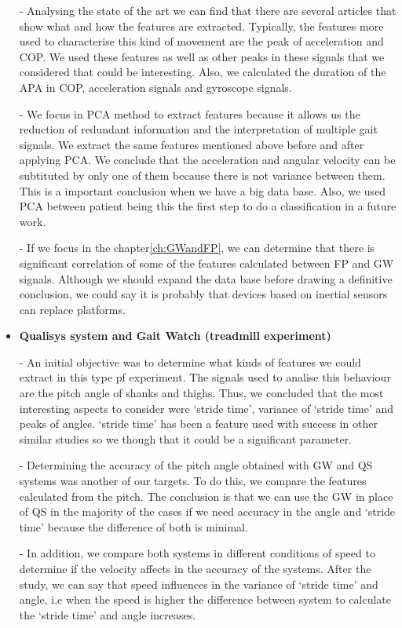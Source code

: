 \begin{itemize}
-	Analysing the state of the art we can find that there are several articles that show what and how the features are extracted. Typically, the features more used to characterise this kind of movement are the peak of acceleration and COP. We used these features  as well as other peaks in these signals that we considered that could be interesting. Also, we calculated the duration of the APA in COP, acceleration signals and gyroscope signals.

-	We focus in PCA method to extract features because it allows us the reduction of redundant information and the interpretation of multiple gait signals. We extract the same features mentioned above before and after applying PCA. We conclude that the acceleration and angular velocity can be subtituted by only one of them because there is not variance between them. This is a important conclusion when we have  a big data base. 
Also, we used PCA between patient  being this the first step to do a classification in a future work.

-	If we focus in the chapter\ref{ch:GWandFP}, we can determine that there is significant correlation  of some of the features calculated between FP and GW signals. Although  we should expand the data base before drawing a definitive conclusion, we could say  it is probably that devices based on inertial sensors can replace platforms.



\item \textbf{Qualisys system and Gait Watch (treadmill experiment)}

-	An initial objective was to determine what kinds of features we could extract in this type pf experiment. The signals used to analise this behaviour are the pitch angle of shanks and thighs. Thus, we concluded that the most interesting aspects to consider were ‘stride time’, variance of ‘stride time’  and peaks of angles. ‘stride time’ has been a feature used with success in other similar studies so we though that it could be a significant parameter.

-	Determining the accuracy of the pitch angle obtained with GW and QS systems was another of our targets. To do this, we compare the features calculated from the pitch. The conclusion is that we can use the GW in place of QS in the majority of the cases if we need accuracy in the angle and ‘stride time’ because the difference of both is minimal.

-	In addition, we compare both systems in different conditions of speed to determine if the velocity affects in the accuracy of the systems. After the study, we can say that speed influences in the variance of ‘stride time’ and angle, i.e when the speed is higher the difference between system to calculate the ‘stride time’ and angle increases. 
\end{itemize}

